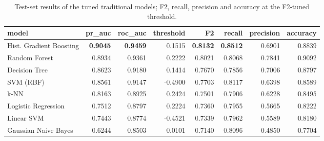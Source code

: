\begin{table}[H]
\centering
\small
\begin{adjustbox}{max width=\linewidth}
\begin{tabular}{lrrrrrrr}
\toprule
model & pr\_auc & roc\_auc & threshold & F2 & recall & precision & accuracy \\
\midrule
Hist. Gradient Boosting & \textbf{0.9045} & \textbf{0.9459} & 0.1515 & \textbf{0.8132} & \textbf{0.8512} & 0.6901 & 0.8839 \\
Random Forest & 0.8934 & 0.9361 & 0.2222 & 0.8021 & 0.8068 & 0.7841 & 0.9092 \\
Decision Tree & 0.8623 & 0.9180 & 0.1414 & 0.7670 & 0.7856 & 0.7006 & 0.8797 \\
SVM (RBF) & 0.8561 & 0.9147 & -0.4900 & 0.7703 & 0.8117 & 0.6398 & 0.8589 \\
k-NN & 0.8163 & 0.8925 & 0.2424 & 0.7501 & 0.7906 & 0.6228 & 0.8495 \\
Logistic Regression & 0.7512 & 0.8797 & 0.2224 & 0.7360 & 0.7955 & 0.5665 & 0.8222 \\
Linear SVM & 0.7443 & 0.8774 & -0.4521 & 0.7339 & 0.7962 & 0.5589 & 0.8180 \\
Gaussian Naive Bayes & 0.6244 & 0.8503 & 0.0101 & 0.7140 & 0.8096 & 0.4850 & 0.7704 \\
\bottomrule
\end{tabular}
\end{adjustbox}
\caption{Test-set results of the tuned traditional models; F2, recall, precision and accuracy at the F2-tuned threshold.}
\label{tab:test_traditional}
\end{table}
